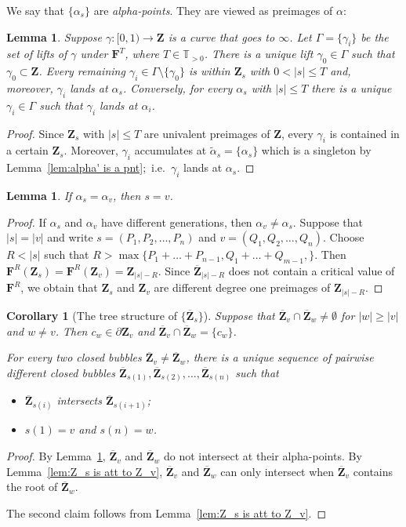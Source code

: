 \documentclass{amsart}
\newcommand{\1}{{\mathbb 1 }}
\newcommand\binfty{{\infty}}%
\newcommand\PT{\mathbb{ T}}
\newcommand{\bF}{{\mathbf F}}
\newcommand{\bZ}{{\mathbf Z}}
\newtheorem{cor}[thm]{Corollary}
\newtheorem{lem}[thm]{Lemma}
\theoremstyle{remark}
\numberwithin{equation}{section}
\theoremstyle{definition}
\theoremstyle{nonumberbreak}
\begin{document}
We say that $\{\alpha_s\}$ are \emph{alpha-points}. They are viewed as preimages of $\alpha$: 
\begin{lem}
\label{lem:preim of alpha}
Suppose $\gamma\colon [0,1)\to \bZ$ is a curve that goes to $\binfty$.  Let $\Gamma=\{\gamma_i\}$ be the set of lifts of $\gamma$ under $\bF^T$, where $T\in \PT_{>0}$. There is a unique lift $\gamma_0\in \Gamma$ such that $\gamma_0\subset \bZ$. Every remaining $\gamma_i\in \Gamma\setminus \{\gamma_0\}$ is within $\bZ_s$ with $0<|s|\le T$ and, moreover, $\gamma_i$ lands at $\alpha_s$. Conversely, for every $\alpha_s$ with $|s|\le T$ there is a unique $\gamma_i\in \Gamma$ such that $\gamma_i$ lands at $\alpha_i$.
\end{lem}
\begin{proof}
Since $\bZ_s$ with $|s|\le T$ are univalent preimages of $\bZ$, every $\gamma_i$ is contained in a certain $\bZ_s$. Moreover, $\gamma_i$ accumulates at $\widetilde \alpha_s=\{\alpha_s\}$ which is a singleton by Lemma~\ref{lem:alpha' is a pnt};~i.e.~$\gamma_i$ lands at $\alpha_s$. 
\end{proof}

\begin{lem}
\label{lem:alpha_s= alpha_v}
If $\alpha_s=\alpha_v$, then $s=v$. 
\end{lem}
\begin{proof}
If $\alpha_s$ and $\alpha_v$ have different generations, then $\alpha_v\not=\alpha_s$. Suppose that $|s|=|v|$ and write $s=(P_1,P_2,\dots, P_n)$ and $v=(Q_1,Q_2,\dots, Q_n)$. Choose $R<|s|$ such that $R>\max\{P_1+\dots + P_{n-1}, Q_1+\dots + Q_{m-1},\}$. Then $\bF^R(\bZ_s) = \bF^R(\bZ_v)=\bZ_{|s|-R}$. Since $\overline \bZ_{|s|-R}$ does not contain a critical value of $\bF^{R}$, we obtain that $\bZ_s$ and $\bZ_v$ are different degree one preimages of $\bZ_{|s|-R}$.
\end{proof}

\begin{cor}[The tree structure of $\{\overline \bZ_s\}$]
\label{cor:tree str of closed bubbles}
Suppose that $\overline \bZ_v\cap \overline \bZ_w\not=\emptyset$ for $|w|\ge |v|$ and $w\not=v$. Then $c_w\in \partial \bZ_v$ and $\overline \bZ_v \cap \overline \bZ_w=\{c_w\}$.

For every two closed bubbles $\overline \bZ_v\not= \overline \bZ_w$, there is a unique sequence of pairwise different closed bubbles $\overline \bZ_{s(1)},\overline \bZ_{s(2)},\dots,\overline \bZ_{s(n)} $ such that
\begin{itemize}
\item $\overline \bZ_{s(i)}$ intersects $\overline \bZ_{s(i+1)}$;  
\item $s(1)=v$ and $s(n)=w$. 
\end{itemize}
\end{cor}
\begin{proof}
By Lemma~\ref{lem:alpha_s= alpha_v}, $\overline \bZ_v $ and $\overline \bZ_w$ do not intersect at their alpha-points.  By Lemma~\ref{lem:Z_s is att to Z_v},  $\overline \bZ_v $ and $\overline \bZ_w$ can only intersect when $\overline \bZ_v $ contains the root of $\overline \bZ_w$.

The second claim follows from Lemma~\ref{lem:Z_s is att to Z_v}.
\end{proof}
\end{document}
